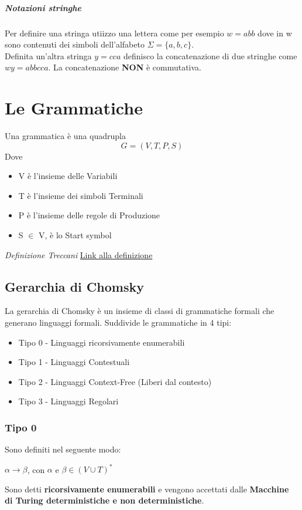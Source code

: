 \documentclass[12pt, a4paper, openany]{book}
\begin{document}
\paragraph*{Notazioni stringhe} Per definire una stringa utiizzo una lettera come per esempio
$w = abb$ dove in w sono contenuti dei simboli dell'alfabeto $\Sigma=\{a,b,c\}$.
\\ Definita un'altra stringa $y=cca$ definisco la concatenazione di due stringhe come $wy = abbcca$.
La concatenazione \textbf{NON} è commutativa.
\chapter{Le Grammatiche}
Una grammatica è una quadrupla
\begin{equation*}
    G=(V, T, P,S)
\end{equation*}
Dove
\begin{itemize}
    \item V è l'insieme delle Variabili
    \item T è l'insieme dei simboli Terminali
    \item P è l'insieme delle regole di Produzione
    \item S $\in$ V, è lo Start symbol
\end{itemize}
\textit{Definizione Treccani} \href{https://www.treccani.it/enciclopedia/grammatica_%28Enciclopedia-della-Matematica%29/}{Link alla definizione}
\section{Gerarchia di Chomsky}
La gerarchia di Chomsky è un insieme di classi di grammatiche formali che generano linguaggi formali.
Suddivide le grammatiche in 4 tipi:
\begin{itemize}
    \item Tipo 0 - Linguaggi ricorsivamente enumerabili
    \item Tipo 1 - Linguaggi Contestuali
    \item Tipo 2 - Linguaggi Context-Free (Liberi dal contesto)
    \item Tipo 3 - Linguaggi Regolari
\end{itemize}
\subsection{Tipo 0}
Sono definiti nel seguente modo:
\begin{center}
    $\alpha \rightarrow \beta$, con $\alpha$ e $\beta \in (V \cup T)^*$
\end{center}
Sono detti \textbf{ricorsivamente enumerabili} e vengono accettati dalle 
\textbf{Macchine di Turing deterministiche e non deterministiche}.
\end{document}
